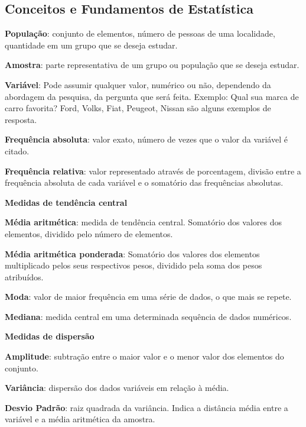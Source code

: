\begin{multicols*}{2}
\subsection{Conceitos e Fundamentos de Estatística}

\textbf{População}: conjunto de elementos, número de pessoas de uma localidade, quantidade em um grupo que se deseja estudar.

\textbf{Amostra}: parte representativa de um grupo ou população que se deseja estudar.

\textbf{Variável}: Pode assumir qualquer valor, numérico ou não, dependendo da abordagem da pesquisa, da pergunta que será feita. Exemplo: Qual sua marca de carro favorita? Ford, Volks, Fiat, Peugeot, Nissan são alguns exemplos de resposta.

\textbf{Frequência absoluta}: valor exato, número de vezes que o valor da variável é citado.

\textbf{Frequência relativa}: valor representado através de porcentagem, divisão entre a frequência absoluta de cada variável e o somatório das frequências absolutas.

\textbf{Medidas de tendência central}

\textbf{Média aritmética}: medida de tendência central. Somatório dos valores dos elementos, dividido pelo número de elementos.

\textbf{Média aritmética ponderada}: Somatório dos valores dos elementos multiplicado pelos seus respectivos pesos, dividido pela soma dos pesos atribuídos.

\textbf{Moda}: valor de maior frequência em uma série de dados, o que mais se repete.

\textbf{Mediana}: medida central em uma determinada sequência de dados numéricos.

\textbf{Medidas de dispersão}

\textbf{Amplitude}: subtração entre o maior valor e o menor valor dos elementos do conjunto.

\textbf{Variância}: dispersão dos dados variáveis em relação à média.

\textbf{Desvio Padrão}: raiz quadrada da variância. Indica a distância média entre a variável e a média aritmética da amostra.


\end{multicols*}
